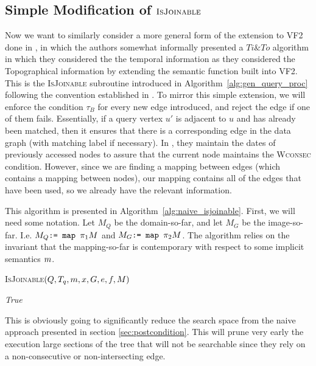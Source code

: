 \subsection{Simple Modification of $\textsc{IsJoinable}$}
\label{sec:naive_joinable}

Now we want to similarly consider a more general form of the extension to VF2
\cite{2004-PAMI-VF2} done in \cite{2016-arXiv-TemporalIso}, in which the authors
somewhat informally presented a $Ti\&To$ algorithm in which they considered the
the temporal information as they considered the Topographical information by
extending the semantic function built into VF2. This is the \textsc{IsJoinable}
subroutine introduced in Algorithm~\ref{alg:gen_query_proc} following the
convention established in \cite{2012-VLDB-IsoSurvey}. To mirror this simple
extension, we will enforce the condition $\tau_B$ for every new edge introduced,
and reject the edge if one of them fails. Essentially, if a query vertex $u'$ is
adjacent to $u$ and has already been matched, then it ensures that there is a
corresponding edge in the data graph (with matching label if necessary). In
\cite{2004-PAMI-VF2}, they maintain the dates of previously accessed nodes to
assure that the current node maintains the \textsc{Wconsec} condition. However,
since we are finding a mapping between edges (which contains a mapping between
nodes), our mapping contains all of the edges that have been used, so we already
have the relevant information.

This algorithm is presented in Algorithm~\ref{alg:naive_isjoinable}. First, we
will need some notation. Let $M_Q$ be the domain-so-far, and let $M_G$ be the
image-so-far. I.e. $M_Q \texttt{:= } \texttt{map } \pi_1 M$ and $M_G \texttt{:= }
\texttt{map } \pi_2 M$.  The algorithm relies on the invariant that the
mapping-so-far is contemporary with respect to some implicit semantics $m$.

\begin{algorithm}
  \label{alg:naive_isjoinable}
  \caption{\textsc{IsJoinable}$(Q,T_q,m, x,G,e,f,M)$}
  

  
  
  \Return \emph{True}\;
  
\end{algorithm}


This is obviously going to significantly reduce the search space from the naive
approach presented in section \ref{sec:postcondition}. This will prune very
early the execution large sections of the tree that will not be searchable since
they rely on a non-consecutive or non-intersecting edge.
